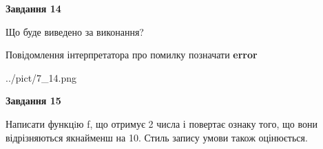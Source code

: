 \documentclass[11pt, ukrainian]{article}
\begin{document}
{\begin {large}
{\begin {center}\textbf{Завдання 14}\end {center}}\par
Що буде виведено за виконання? \par
Повідомлення інтерпретатора про помилку позначати \textbf{error}

\begin{center}
	{../pict/7_14.png}
\end{center}
\newpage

{\begin {center}\textbf{Завдання 15}\end {center}}\par

Написати функцiю f, що отримує 2 числа і повертає ознаку того, що вони відрізняються якнайменш на 10. Стиль запису умови також оцінюється.\par
\newpage

\end {large}}
\end{document}
